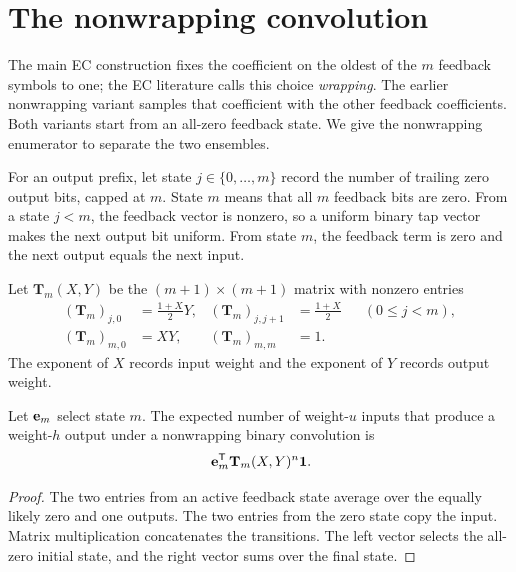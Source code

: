 \section{The nonwrapping convolution}
\label{app:nonwrapping}

The main EC construction fixes the coefficient on the oldest of the $m$
feedback symbols to one; the EC literature calls this choice
\emph{wrapping}.  The earlier nonwrapping variant samples that coefficient
with the other feedback coefficients.  Both variants start from an all-zero
feedback state.  We give the nonwrapping enumerator to separate the two
ensembles.

For an output prefix, let state $j\in\{0,\ldots,m\}$ record the number of
trailing zero output bits, capped at $m$.  State $m$ means that all $m$
feedback bits are zero.  From a state $j<m$, the feedback vector is nonzero,
so a uniform binary tap vector makes the next output bit uniform.  From state
$m$, the feedback term is zero and the next output equals the next input.

Let $\mathbf T_m(X,Y)$ be the $(m+1)\times(m+1)$ matrix with nonzero entries
\begin{align}
 (\mathbf T_m)_{j,0}&=\frac{1+X}{2}Y,&
 (\mathbf T_m)_{j,j+1}&=\frac{1+X}{2} &&(0\leq j<m),
 \label{eq:nonwrapping-active}\\
 (\mathbf T_m)_{m,0}&=XY,&
 (\mathbf T_m)_{m,m}&=1.
 \label{eq:nonwrapping-zero}
\end{align}
The exponent of $X$ records input weight and the exponent of $Y$ records
output weight.

\begin{lemma}
\label{lem:nonwrapping-enumerator}
Let $\mathbf e_m$ select state $m$.  The expected number of weight-$u$ inputs that
produce a weight-$h$ output under a nonwrapping binary convolution is
\begin{equation}
 [X^uY^h]\,\e_m^{\mathsf T}\mathbf T_m(X,Y)^n\one.
 \label{eq:nonwrapping-enumerator}
\end{equation}
\end{lemma}

\begin{proof}
The two entries from an active feedback state average over the equally likely
zero and one outputs.  The two entries from the zero state copy the input.
Matrix multiplication concatenates the transitions.  The left vector selects
the all-zero initial state, and the right vector sums over the final state.
\end{proof}

